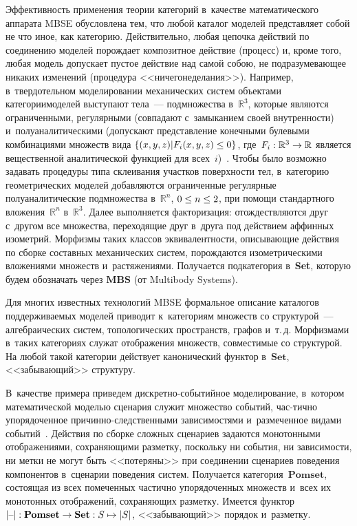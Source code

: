 \begin{multicols}{2}
   Эффективность применения теории категорий в~качестве математического 
аппарата \mbox{MBSE} обуслов\-ле\-на тем, что любой каталог моделей представляет 
собой не что иное, как категорию. Действительно, любая цепочка действий по 
соединению моделей порождает композитное действие (процесс) и, кроме того, 
любая модель допускает пустое действие над самой собою, не 
подразумевающее никаких изменений (процедура <<ничегонеделания>>). 
Например, в~твердотельном моделировании механических систем объектами 
категории\linebreak моделей выступают тела~--- подмножества в~$\mathbb{R}^3$, 
которые являются ограниченными, регулярными\linebreak
 (совпадают с~замыканием 
своей внутренности) и~полуаналитическими (допускают представление 
конечными булевыми комбинациями множеств вида $\{(x, y, z) \vert  F_i(x, y, 
z)\hm\leq 0\}$, где~$F_i : \mathbb{R}^3\hm\to \mathbb{R}$ является 
вещественной аналитической функцией для всех~$i$)~\cite{10-kov}. Чтобы 
было возможно задавать процедуры типа склеивания участков поверхности тел, в~категорию геометрических моделей добавляются ограниченные регулярные 
полуаналитические подмножества в~$\mathbb{R}^n$, $0 \hm\leq n \hm\leq 2$, 
при помощи стандартного вложения~$\mathbb{R}^n$ в~$\mathbb{R}^3$. Далее 
выполняется факторизация: отождествляются друг с~другом все множества, 
переходящие друг в~друга под действием аффинных изометрий. Морфизмы 
таких классов эквивалентности, описывающие действия по сборке составных 
механических сис\-тем, порождаются изометрическими вложениями множеств 
и~растяжениями. Получается подкатегория в~\textbf{Set}, которую будем обозначать 
через $\mathbf{MBS}$ (от Multibody Systems).
   
   Для многих известных технологий MBSE формальное описание каталогов 
поддерживаемых моделей приводит к~категориям множеств со структурой~--- 
алгебраических систем, топологических пространств, графов и~т.\,д. 
Морфизмами в~таких категориях служат отображения множеств, со\-вмес\-ти\-мые 
со структурой. На любой такой категории действует канонический функтор 
в~$\mathbf{Set}$, <<забывающий>> структуру. 

В~качестве примера приведем  
дис\-крет\-но-со\-бы\-тий\-ное моделирование, в~котором математической 
моделью сценария служит множество событий, час-\linebreak тич\-но упорядоченное  
при\-чин\-но-след\-ст\-вен\-ны\-ми зависимостями и~размеченное видами 
событий~\cite{15-kov}. Действия по сборке сложных сценариев задаются 
монотонными отображениями, сохраняющими разметку, поскольку ни 
события, ни зависимости, ни метки не могут быть <<потеряны>> при 
соединении сценариев поведения компонентов в~сценарии поведения систем. 
Получается категория~$\mathbf{Pomset}$, состоящая из всех помеченных 
частично упорядоченных множеств и~всех их монотонных отображений, 
сохраняющих разметку. Имеется функтор $\vert \mbox{--} \vert : 
\mathbf{Pomset}\hm\to \mathbf{Set} : S \mapsto \vert S\vert$, <<забывающий>> 
порядок и~разметку.
   

\end{multicols}

